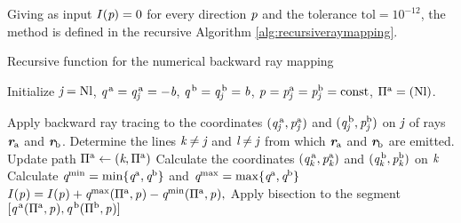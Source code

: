 Giving as input $I(\textit{p})=0$ for every direction $\textit{p}$ and the tolerance $\textrm{tol}=10^{-12}$,
the method is defined in the recursive Algorithm \ref{alg:recursiveraymapping}.
\begin{algorithm}
\caption{Recursive function for the numerical backward ray mapping}\label{alg:recursiveraymapping}
Initialize $\textit{j} = \textrm{Nl}$, $\textit{q}^{\,\textrm{a}}= \textit{q}^{\,\textrm{a}}_{\textit{j}}=-\textit{b}$, $\textit{q}^{\,\textrm{b}}= \textit{q}^{\,\textrm{b}}_{\textit{j}}=\textit{b}$, $\textit{p}_{\textrm{} \textit{}}=\textit{p}^{\textrm{a}}_{\textit{j}}=\textit{p}^{\textrm{b}}_{\textit{j}}=\textrm{const}$, $\Pi^{\textrm{a}}=({\textrm{Nl}})$.
\begin{algorithmic}[1]
\State Apply backward ray tracing to the coordinates $(\textit{q}^{\,\textrm{a}}_{\textit{j}},\textit{p}^{\textrm{a}}_{\textit{j}})$ and $(\textit{q}^{\,\textrm{b}}_{\textit{j}},\textit{p}^{\textrm{b}}_{\textit{j}})$ on $\textit{j}$ of rays $\textit{\textbf{r}}_{\textrm{a}}$ and $\textit{\textbf{r}}_{\textrm{b}}$.
\State Determine the lines $\textit{k}\neq\textit{j}$ and $\textit{l}\neq\textit{j}$ from which $\textit{\textbf{r}}_{\textrm{a}}$ and $\textit{\textbf{r}}_{\textrm{b}}$ are emitted.
\State Update path $\Pi^{\textrm{a}}\gets(\textit{k}, \Pi^{\textrm{a}})$
\State Calculate the coordinates $(\textit{q}^{\,\textrm{a}}_{\textit{k}},\textit{p}^{\textrm{a}}_{\textit{k}})$ and $(\textit{q}^{\,\textrm{b}}_{\textit{k}}, \textit{p}^{\textrm{b}}_{\textit{k}})$ on $\textit{k}$
\If {$\lineaj = \lineak$}
\State{}
\Else  \State Calculate
$\textit{q}^{\textrm{min}} = \min\{\textit{q}^{\textrm{a}}, \textit{q}^{\textrm{b}}\}$ and $\textit{q}^{\textrm{max}} = \max\{\textit{q}^{\textrm{a}}, \textit{q}^{\textrm{b}}\}$
\State $I(\textit{p}_{\textrm{} \textit{}}) = I(\textit{p}_{\textrm{} \textit{}})+\textit{q}^{\textrm{max}}(\Pi^{\textrm{a}}, \textit{p}_{\textrm{} \textit{}})
-\textit{q}^{\textrm{min}}(\Pi^{\textrm{a}}, \textit{p}_{\textrm{} \textit{}}),$
\EndIf
\Else 
\State Apply bisection to the segment $[\textit{q}^{\,\textrm{a}}(\Pi^\textrm{a}, \textit{p}_{\textrm{} \textit{}}), \textit{q}^{\,\textrm{b}}(\Pi^\textrm{b}, \textit{p}_{\textrm{} \textit{}})]$

\end{algorithmic}
\end{algorithm}
